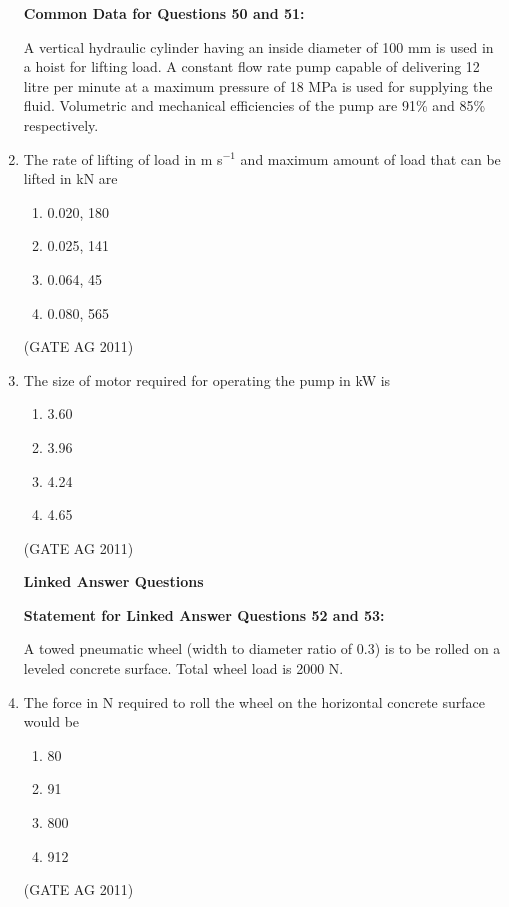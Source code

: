 \documentclass[journal,12pt,onecolumn]{IEEEtran}
\theoremstyle{remark}
\begin{document}
\begin{enumerate}
\textbf{Common Data for Questions 50 and 51:}

A vertical hydraulic cylinder having an inside diameter of 100 mm is used in a hoist for lifting load. 
A constant flow rate pump capable of delivering 12 litre per minute at a maximum pressure of 18 MPa is used for supplying the fluid. 
Volumetric and mechanical efficiencies of the pump are 91\% and 85\% respectively.

\item The rate of lifting of load in m s$^{-1}$ and maximum amount of load that can be lifted in kN are
\begin{multicols}{4}
\begin{enumerate}
    \item 0.020, 180
    \item 0.025, 141
    \item 0.064, 45
    \item 0.080, 565
\end{enumerate}
\end{multicols}
\hfill{(GATE AG 2011)}



\item The size of motor required for operating the pump in kW is
\begin{multicols}{4}
\begin{enumerate}
    \item 3.60
    \item 3.96
    \item 4.24
    \item 4.65
\end{enumerate}
\end{multicols}
\hfill{(GATE AG 2011)}

\textbf{Linked Answer Questions}

\textbf{Statement for Linked Answer Questions 52 and 53:}

A towed pneumatic wheel (width to diameter ratio of 0.3) is to be rolled on a leveled concrete surface. 
Total wheel load is 2000 N.


\item The force in N required to roll the wheel on the horizontal concrete surface would be
\begin{multicols}{4}
\begin{enumerate}
    \item 80
    \item 91
    \item 800
    \item 912
\end{enumerate}
\end{multicols}
\hfill{(GATE AG 2011)}




\end{enumerate}
\end{document}
